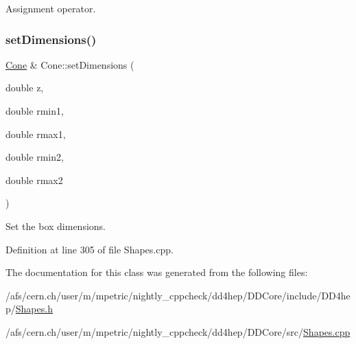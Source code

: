 Assignment operator. 

\hypertarget{class_d_d4hep_1_1_geometry_1_1_cone_a946a244f8072fba8aab8d71379bafa46}{}\label{class_d_d4hep_1_1_geometry_1_1_cone_a946a244f8072fba8aab8d71379bafa46} 
\subsubsection{\texorpdfstring{set\+Dimensions()}{setDimensions()}}
{\footnotesize\ttfamily \hyperlink{class_d_d4hep_1_1_geometry_1_1_cone}{Cone} \& Cone\+::set\+Dimensions (\begin{DoxyParamCaption}\item[{double}]{z,  }\item[{double}]{rmin1,  }\item[{double}]{rmax1,  }\item[{double}]{rmin2,  }\item[{double}]{rmax2 }\end{DoxyParamCaption})}



Set the box dimensions. 



Definition at line 305 of file Shapes.\+cpp.



The documentation for this class was generated from the following files\+:\begin{DoxyCompactItemize}
\item 
/afs/cern.\+ch/user/m/mpetric/nightly\+\_\+cppcheck/dd4hep/\+D\+D\+Core/include/\+D\+D4hep/\hyperlink{_shapes_8h}{Shapes.\+h}\item 
/afs/cern.\+ch/user/m/mpetric/nightly\+\_\+cppcheck/dd4hep/\+D\+D\+Core/src/\hyperlink{_shapes_8cpp}{Shapes.\+cpp}\end{DoxyCompactItemize}
